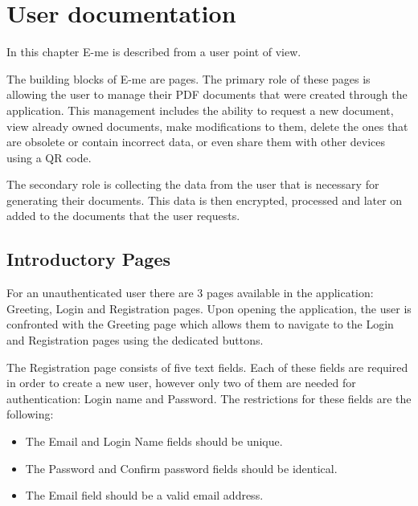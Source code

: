 \chapter{User documentation}\label{ch:BASIC}

\begin{summary}
	In this chapter E-me is described from a user point of view.
\end{summary}

The building blocks of E-me are pages.
The primary role of these pages is allowing the user to manage their PDF documents that were created through the application.
This management includes the ability to request a new document, view already owned documents, make modifications to them, delete the ones that are
obsolete or contain incorrect data, or even share them with other devices using a QR code.

The secondary role is collecting the data from the user that is necessary for generating their documents. 
This data is then encrypted, processed and later on added to the documents that the user requests. 

	\section{Introductory Pages}

		For an unauthenticated user there are 3 pages available in the application: Greeting, Login and Registration pages.
		Upon opening the application, the user is confronted with the Greeting page which allows them to navigate to the Login and Registration pages using the dedicated buttons.

		The Registration page consists of five text fields.
		Each of these fields are required in order to create a new user, however only two of them are needed for authentication: Login name and Password.
		The restrictions for these fields are the following:
		\begin{itemize}
			\item The Email and Login Name fields should be unique.
			\item The Password and Confirm password fields should be identical.
			\item The Email field should be a valid email address.
		\end{itemize}
		
